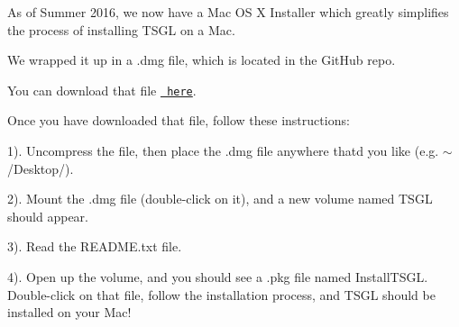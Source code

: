 As of Summer 2016, we now have a Mac OS X Installer which greatly simplifies the process of installing T\+S\+GL on a Mac.

We wrapped it up in a {\ttfamily .dmg} file, which is located in the Git\+Hub repo.

You can download that file \href{https://github.com/Calvin-CS/TSGL/blob/master/MacBinInstaller/TSGL.dmg}{\texttt{ here}}.

Once you have downloaded that file, follow these instructions\+:

1). Uncompress the file, then place the {\ttfamily .dmg} file anywhere that\textquotesingle{}d you like (e.\+g. {\ttfamily $\sim$/\+Desktop/}).

2). Mount the {\ttfamily .dmg} file (double-\/click on it), and a new volume named {\ttfamily T\+S\+GL} should appear.

3). Read the {\ttfamily R\+E\+A\+D\+M\+E.\+txt} file.

4). Open up the volume, and you should see a {\ttfamily .pkg} file named {\ttfamily Install\+T\+S\+GL}. Double-\/click on that file, follow the installation process, and T\+S\+GL should be installed on your Mac! 
